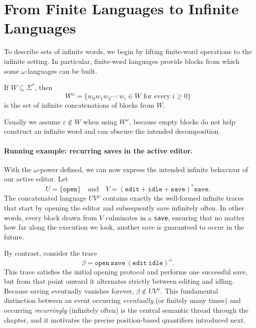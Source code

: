 \section{From Finite Languages to Infinite Languages}
\label{sec:omega-language-ops}

To describe sets of infinite words, we begin by lifting finite-word
operations to the infinite setting.  In particular, finite-word
languages provide blocks from which some $\omega$-languages can be built.

\begin{definition}
\label{def:omega-power}
If $W\subseteq\Sigma^*$, then
\[
  W^\omega =
  \{w_0w_1w_2\cdots : w_i\in W\text{ for every }i\geq 0\}
\]
is the set of infinite concatenations of blocks from $W$.
\end{definition}

Usually we assume $\varepsilon\notin W$ when using $W^\omega$, because
empty blocks do not help construct an infinite word and can obscure the
intended decomposition.

\paragraph{Running example: recurring saves in the active editor.}
With the $\omega$-power defined, we can now express the intended infinite
behaviour of our active editor.  Let
\[
  U = \{\texttt{open}\} \quad\text{and}\quad
  V = (\texttt{edit}+\texttt{idle}+\texttt{save})^*\texttt{save}.
\]
The concatenated language $UV^\omega$ contains exactly the well-formed infinite
traces that start by opening the editor and subsequently save infinitely often.
In other words, every block drawn from $V$ culminates in a \texttt{save}, ensuring
that no matter how far along the execution we look, another save is guaranteed
to occur in the future.

By contrast, consider the trace
\[
  \beta = \texttt{open}\ \texttt{save}\,(\texttt{edit}\ \texttt{idle})^\omega.
\]
This trace satisfies the initial opening protocol and performs one successful
save, but from that point onward it alternates strictly between editing and
idling.  Because saving eventually vanishes forever, $\beta \notin UV^\omega$.
This fundamental distinction between an event occurring \emph{eventually} (or
finitely many times) and occurring \emph{recurringly} (infinitely often) is the
central semantic thread through the chapter, and it motivates the precise
position-based quantifiers introduced next.

